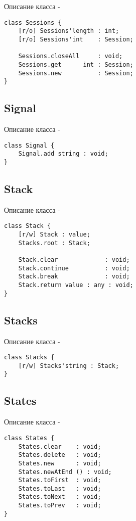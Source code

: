 \noindent Описание класса  -
\begin{lstlisting}[numbers=none]
class Sessions {
    [r/o] Sessions'length : int;
	[r/o] Sessions'int    : Session;
	
    Sessions.closeAll     : void;
	Sessions.get      int : Session;
	Sessions.new          : Session;
}
\end{lstlisting}

\subsection{{\color{orange} Signal}}

\noindent Описание класса  -
\begin{lstlisting}[numbers=none]
class Signal {
    Signal.add string : void;
}
\end{lstlisting}

\subsection{{\color{orange} Stack}}

\noindent Описание класса  -
\begin{lstlisting}[numbers=none]
class Stack {
    [r/w] Stack : value;
    Stacks.root : Stack;
	
    Stack.clear             : void;
	Stack.continue          : void;
	Stack.break             : void;
	Stack.return value : any : void;
}
\end{lstlisting}

\subsection{{\color{orange} Stacks}}

\noindent Описание класса  -
\begin{lstlisting}[numbers=none]
class Stacks {
    [r/w] Stacks'string : Stack;
}
\end{lstlisting}

\subsection{{\color{orange} States}}

\noindent Описание класса  -
\begin{lstlisting}[numbers=none]
class States {
    States.clear    : void;
	States.delete   : void;
	States.new      : void;
	States.newAtEnd () : void;
	States.toFirst  : void;
	States.toLast   : void;
	States.toNext   : void;
	States.toPrev   : void;
}
\end{lstlisting}

